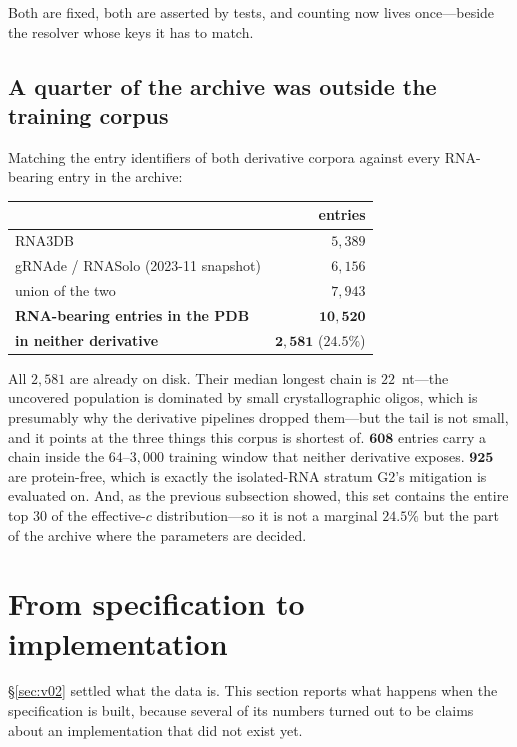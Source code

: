 \documentclass[11pt,a4paper]{article}
\begin{document}
Both are fixed, both are asserted by tests, and counting now lives once---beside
the resolver whose keys it has to match.

\subsection{A quarter of the archive was outside the training corpus}

Matching the entry identifiers of both derivative corpora against every
RNA-bearing entry in the archive:

\begin{table}[h]
\centering
\small
\begin{tabular}{lr}
\toprule
& \textbf{entries} \\
\midrule
RNA3DB                              & $5{,}389$ \\
gRNAde / RNASolo (2023-11 snapshot) & $6{,}156$ \\
union of the two                    & $7{,}943$ \\
\textbf{RNA-bearing entries in the PDB} & $\mathbf{10{,}520}$ \\
\textbf{in neither derivative}      & $\mathbf{2{,}581}$ ($24.5\%$) \\
\bottomrule
\end{tabular}
\end{table}

\noindent
All $2{,}581$ are already on disk. Their median longest chain is $22$~nt---the
uncovered population is dominated by small crystallographic oligos, which is
presumably why the derivative pipelines dropped them---but the tail is not
small, and it points at the three things this corpus is shortest of.
$\mathbf{608}$ entries carry a chain inside the $64$--$3{,}000$ training window that
neither derivative exposes. $\mathbf{925}$ are protein-free, which is exactly
the isolated-RNA stratum G2's mitigation is evaluated on. And, as the previous
subsection showed, this set contains the entire top $30$ of the effective-$c$
distribution---so it is not a marginal $24.5\%$ but the part of the archive
where the parameters are decided.

\section{From specification to implementation}
\label{sec:impl}

\S\ref{sec:v02} settled what the data is. This section reports what happens when
the specification is built, because several of its numbers turned out to be
claims about an implementation that did not exist yet.
\end{document}
